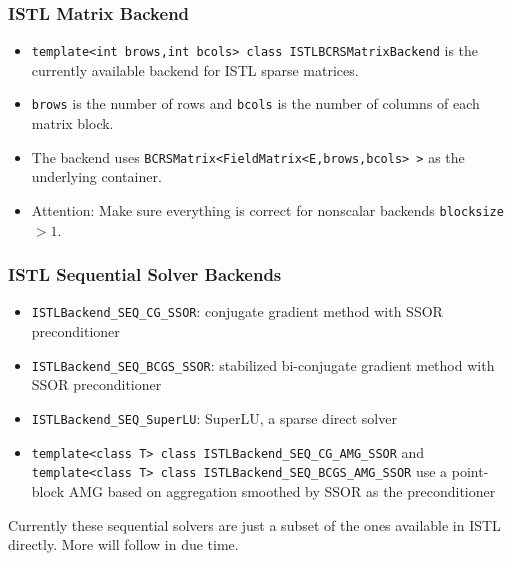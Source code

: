 \begin{frame}
  \frametitle{ISTL Matrix Backend}
  \begin{itemize}
    \item \lstinline!template<int brows,int bcols> class ISTLBCRSMatrixBackend!
      is the currently available backend for ISTL sparse
      matrices.
    \item \lstinline!brows! is the number of rows and \lstinline!bcols!
      is the number of columns of each matrix block.
  \item The backend uses
    \lstinline!BCRSMatrix<FieldMatrix<E,brows,bcols> >! as the
    underlying container.
  \item Attention: Make sure everything is correct for nonscalar backends
    \lstinline!blocksize!$>1$.
  \end{itemize}
\end{frame}
\begin{frame}[fragile]
  \frametitle{ISTL Sequential Solver Backends}
    \begin{itemize}
    \item \lstinline!ISTLBackend_SEQ_CG_SSOR!:  conjugate gradient method with SSOR preconditioner
    \item \lstinline!ISTLBackend_SEQ_BCGS_SSOR!: stabilized bi-conjugate gradient
      method with SSOR preconditioner
    \item \lstinline!ISTLBackend_SEQ_SuperLU!: SuperLU, a sparse
      direct solver
    \item \lstinline!template<class T> class ISTLBackend_SEQ_CG_AMG_SSOR! and
      \lstinline!template<class T> class ISTLBackend_SEQ_BCGS_AMG_SSOR!
      use a point-block AMG based on aggregation smoothed by SSOR as
      the preconditioner
    \end{itemize}
    Currently these sequential solvers are just a subset of the ones
  available in ISTL directly. More will follow in due time.
\end{frame}

